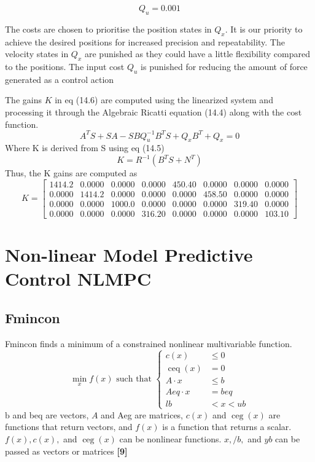 \documentclass{UoNMCHA}
\numberwithin{equation}{section}
\begin{document}
	\begin{equation}
	Q_{u}=0.001
	\end{equation}
	
	The costs are chosen to prioritise the position states in $Q_{x}$. It is our priority to achieve the desired
	positions for increased precision and repeatability. The velocity states in $Q_{x}$ are punished as they could
	have a little flexibility compared to the positions. The input cost $Q_{u}$ is punished for reducing the amount
	of force generated as a control action
	
	The gains $K$ in eq (14.6) are computed using the linearized system and processing it through the
	Algebraic Ricatti equation (14.4) along with the cost function.
	$$
	A^{T} S+S A-S B Q_{u}^{-1} B^{T} S+Q_{x} B^{T}+Q_{x}=0
	$$
	Where $\mathrm{K}$ is derived from S using eq (14.5)
	$$
	K=R^{-1}\left(B^{T} S+N^{T}\right)
	$$
	Thus, the $\mathrm{K}$ gains are computed as
	\begin{equation}
	K = 
	\begin{bmatrix}1414.2 & 0.0000 & 0.0000 & 0.0000 & 450.40 & 0.0000 & 0.0000 & 0.0000 \\ 0.0000 & 1414.2 & 0.0000 & 0.0000 & 0.0000 & 458.50 & 0.0000 & 0.0000 \\ 0.0000 & 0.0000 & 1000.0 & 0.0000 & 0.0000 & 0.0000 & 319.40 & 0.0000 \\ 0.0000 & 0.0000 & 0.0000 & 316.20 & 0.0000 & 0.0000 & 0.0000 & 103.10\end{bmatrix}
	\end{equation}
	
	\section{Non-linear Model Predictive Control NLMPC}
	
	\subsection{Fmincon}
	Fmincon finds a minimum of a constrained nonlinear multivariable function.
	$$
	\min _{x} f(x) \text { such that }\left\{\begin{aligned}
	c(x) & \leq 0 \\
	\operatorname{ceq}(x) &=0 \\
	A \cdot x & \leq b \\
	A e q \cdot x &=b e q \\
	l b &<x<u b
	\end{aligned}\right.
	$$
	$\mathrm{b}$ and beq are vectors, $A$ and Aeg are matrices, $c(x)$ and $\operatorname{ceg}(x)$ are functions that return vectors, and $f(x)$
	is a function that returns a scalar. $f(x), c(x),$ and $\operatorname{ceg}(x)$ can be nonlinear functions. $x, / b,$ and $y b$ can be
	passed as vectors or matrices \textbf{[9]}\\
	
\end{document}
